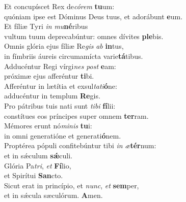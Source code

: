 \oddverse Et concupíscet Rex de\textit{có}\textit{rem} \textbf{tu}um:~\*\\
\oddverse quóniam ipse est Dóminus Deus tuus, et adorábunt \textbf{e}um.\\
\evenverse Et fíliæ Tyri \textit{in} \textit{mu}\textbf{né}ribus~\*\\
\evenverse vultum tuum deprecabúntur: omnes dívites \textbf{ple}bis.\\
\oddverse Omnis glória ejus fíliæ Re\textit{gis} \textit{ab} \textbf{in}tus,~\*\\
\oddverse in fímbriis áureis circumamícta varie\textbf{tá}tibus.\\
\evenverse Adducéntur Regi vírgi\textit{nes} \textit{post} \textbf{e}am:~\*\\
\evenverse próximæ ejus afferéntur \textbf{ti}bi.\\
\oddverse Afferéntur in lætítia et exsul\textit{ta}\textit{ti}\textbf{ó}ne:~\*\\
\oddverse adducéntur in templum \textbf{Re}gis.\\
\evenverse Pro pátribus tuis nati sunt \textit{ti}\textit{bi} \textbf{fí}lii:~\*\\
\evenverse constítues eos príncipes super omnem \textbf{ter}ram.\\
\oddverse Mémores erunt nó\textit{mi}\textit{nis} \textbf{tu}i:~\*\\
\oddverse in omni generatióne et generati\textbf{ó}nem.\\
\evenverse Proptérea pópuli confitebúntur tibi \textit{in} \textit{æ}\textbf{tér}num:~\*\\
\evenverse et in sǽculum \textbf{sǽ}culi.\\
\oddverse Glória Pa\textit{tri}, \textit{et} \textbf{Fí}lio,~\*\\
\oddverse et Spirítui \textbf{San}cto.\\
\evenverse Sicut erat in princípio, et \textit{nunc}, \textit{et} \textbf{sem}per,~\*\\
\evenverse et in sǽcula sæculórum. \textbf{A}men.\\
